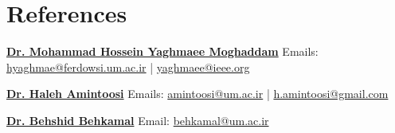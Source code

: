 \documentclass[11pt,a4paper,sans]{moderncv}        %
\begin{document}







\section{References}
\cvitem{} {\href{http://profsite.um.ac.ir/~hyaghmae/}{\textbf{Dr. Mohammad Hossein Yaghmaee Moghaddam}}}
\cvitem{} {Emails: \href{mailto:hyaghmae@ferdowsi.um.ac.ir}{hyaghmae@ferdowsi.um.ac.ir} | \href{mailto:yaghmaee@ieee.org}{yaghmaee@ieee.org} }

\cvitem{} {\href{http://amintoosi.profcms.um.ac.ir}{\textbf{Dr. Haleh Amintoosi}}}
\cvitem{} {Emails: \href{mailto:amintoosi@um.ac.ir}{amintoosi@um.ac.ir} | \href{mailto:h.amintoosi@gmail.com}{h.amintoosi@gmail.com} }

\cvitem{} {\href{http://behkamal.profcms.um.ac.ir}{\textbf{Dr. Behshid Behkamal}}}
\cvitem{} {Email: \href{mailto:behkamal@um.ac.ir}{behkamal@um.ac.ir}}

\end{document}
